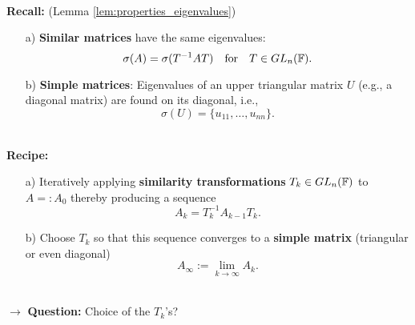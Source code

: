 \begin{frame}
~\\
 \textbf{Recall:} (Lemma \ref{lem:properties_eigenvalues})
\begin{itemize}
	\item[a)] \textbf{\color{yellow}Similar matrices} have the same eigenvalues: $$\sigma(A) = \sigma(T^{-1}AT) ~~~\text{for}~~~T\in GL_n({\mathbb{F}}).$$
	\item[b)] \textbf{\color{codegreen}Simple matrices}: Eigenvalues of an upper triangular matrix $U$ (e.g., a diagonal matrix) are found on its diagonal, i.e.,
	$$\sigma(U) = \{u_{11},\ldots, u_{nn} \} .$$
\end{itemize}
~\\
\textbf{Recipe:}
  \begin{itemize}
	\item[a)] Iteratively applying \textbf{\color{yellow}similarity transformations} $T_k \in GL_n({\mathbb{F}})$ to $A=: A_0$ thereby producing a sequence
	$$A_{k} = T_k^{-1} A_{k-1} T_k. $$
	\vspace{0.15cm}\item[b)] Choose $T_k$ so that this sequence converges to a \textbf{\color{codegreen}simple matrix} (triangular or even diagonal)
	$$ A_\infty :=\lim_{k\to\infty} A_k  .$$
\end{itemize}
~\\
$\rightarrow$ \textbf{Question:} Choice of the $T_k$'s?
\end{frame}


